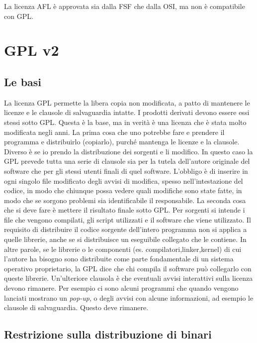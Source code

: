 La licenza AFL è approvata sia dalla FSF che dalla OSI, ma non è compatibile con GPL.

\section{GPL v2}

\subsection{Le basi}

La licenza GPL permette la libera copia non modificata, a patto di mantenere le licenze e le clausole di salvaguardia intatte. I prodotti derivati devono essere essi stessi sotto GPL. Questa è la base, ma in verità è una licenza che è stata molto modificata negli anni. La prima cosa che uno potrebbe fare e prendere il programma e distribuirlo (copiarlo), purché mantenga le licenze e la clausole. Diverso è se io prendo la distribuzione dei sorgenti e li modifico. In questo caso la GPL prevede tutta una serie di clausole sia per la tutela dell'autore originale del software che per gli stessi utenti finali di quel software. L'obbligo è di inserire in ogni singolo file modificato degli avvisi di modifica, spesso nell'intestazione del codice, in modo che chiunque possa vedere quali modifiche sono state fatte, in modo che se sorgono problemi sia identificabile il responsabile. La seconda cosa che si deve fare è mettere il risultato finale sotto GPL. Per sorgenti si intende i file che vengono compilati, gli script utilizzati e il software che viene utilizzato. Il requisito di distribuire il codice sorgente dell'intero programma non si applica a quelle librerie, anche se si distribuisce un eseguibile collegato che le contiene. In altre parole, se le librerie o le componenti (es. compilatori,linker,kernel) di cui l'autore ha bisogno sono distribuite come parte fondamentale di un sistema operativo proprietario, la GPL dice che chi compila il software può collegarlo con queste librerie. Un'ulteriore clausola è che eventuali avvisi interattivi sulla licenza devono rimanere. Per esempio ci sono alcuni programmi che quando vengono lanciati mostrano un \textit{pop-up}, o degli avvisi con alcune informazioni, ad esempio le clausole di salvaguardia. Questo deve rimanere. 

\subsection{Restrizione sulla distribuzione di binari}

